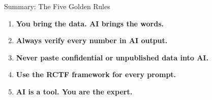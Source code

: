 \documentclass[aspectratio=169]{beamer}
\begin{document}
\begin{frame}{Summary: The Five Golden Rules}
    \begin{enumerate}
        \Large
        \item \textbf{You bring the data. AI brings the words.}
        \vspace{0.3cm}
        \item \textbf{Always verify every number in AI output.}
        \vspace{0.3cm}
        \item \textbf{Never paste confidential or unpublished data into AI.}
        \vspace{0.3cm}
        \item \textbf{Use the RCTF framework for every prompt.}
        \vspace{0.3cm}
        \item \textbf{AI is a tool. You are the expert.}
    \end{enumerate}
\end{frame}
\end{document}
